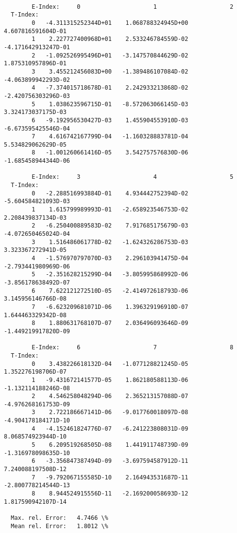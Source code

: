 \documentclass[12pt,dvipdfmx]{article}
\begin{document}
{\begin{small}\begin{verbatim}

        E-Index:     0                     1                     2
  T-Index:
        0   -4.311315252344D+01    1.068788324945D+00    4.607816591604D-01
        1    2.227727400968D+01    2.533246784559D-02   -4.171642913247D-01
        2   -1.092526995496D+01   -3.147570844629D-02    1.875310957896D-01
        3    3.455212456083D+00   -1.389486107084D-02   -4.063899942293D-02
        4   -7.374015718678D-01    2.242933213868D-02   -2.420756303296D-03
        5    1.038623596715D-01   -8.572063066145D-03    3.324173037175D-03
        6   -9.192956530427D-03    1.455904553910D-03   -6.673595425546D-04
        7    4.616742167799D-04   -1.160328883781D-04    5.534829062629D-05
        8   -1.001260661416D-05    3.542757576830D-06   -1.685458944344D-06

        E-Index:     3                     4                     5
  T-Index:
        0   -2.288516993884D-01    4.934442752394D-02   -5.604584821093D-03
        1    1.615799989993D-01   -2.658923546753D-02    2.208439837134D-03
        2   -6.250400889583D-02    7.917685175679D-03   -4.072650465024D-04
        3    1.516486061778D-02   -1.624326286753D-03    3.323367272941D-05
        4   -1.576970797070D-03    2.296103941475D-04   -2.793441980969D-06
        5   -2.351628215299D-04   -3.805995868992D-06   -3.856178638492D-07
        6    7.622121272510D-05   -2.414972618793D-06    3.145956146766D-08
        7   -6.623209681071D-06    1.396329196910D-07    1.644463329342D-08
        8    1.880631768107D-07    2.036496093646D-09   -1.449219917820D-09

        E-Index:     6                     7                     8
  T-Index:
        0    3.438226618132D-04   -1.077128821245D-05    1.352276198706D-07
        1   -9.431672141577D-05    1.862180588113D-06   -1.132114188246D-08
        2    4.546258048294D-06    2.365213157088D-07   -4.976268161753D-09
        3    2.722186667141D-06   -9.017760018097D-08   -4.904178184171D-10
        4   -4.152461824776D-07   -6.241223808031D-09    8.068574923944D-10
        5    6.209519268505D-08    1.441911748739D-09   -1.316978098635D-10
        6   -3.356847387494D-09   -3.697594587912D-11    7.240088197508D-12
        7   -9.792067155585D-10    2.164943531687D-11   -2.800778214544D-13
        8    8.944524915556D-11   -2.169200058693D-12    1.817590942107D-14

  Max. rel. Error:   4.7466 \%
  Mean rel. Error:   1.8012 \%




\end{verbatim}
\end{small}}
\end{document}
